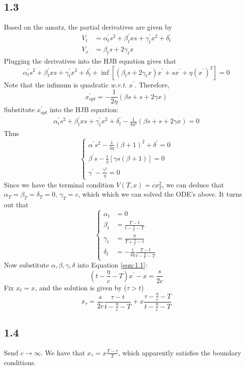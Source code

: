 \documentclass{article}
\begin{document}
\subsection*{1.3}
Based on the ansatz, the partial derivatives are given by
\begin{align*}
    V_t &= \alpha^\prime_t s^2 + \beta^\prime_t xs + \gamma^\prime_t x^2 + \delta^\prime_t \\
    V_x &= \beta_t s + 2\gamma_t x 
\end{align*}
Plugging the derivatives into the HJB equation gives that 
$$ \alpha^\prime_t s^2 + \beta^\prime_t xs + \gamma^\prime_t x^2 + \delta^\prime_t + 
\inf \left[(\beta_t s + 2\gamma_t x)x^\prime + sx^\prime + \eta (x^\prime)^2\right] = 0 $$
Note that the infimum is quadratic \textit{w.r.t.} $x^\prime$. Therefore,
\begin{equation} x^\prime_{opt} = -\frac{1}{2\eta}(\beta s + s + 2\gamma x) \label{eqn:1.1} \end{equation}
Substitute $x^\prime_{opt}$ into the HJB equation:
\begin{gather*}
    \alpha^\prime_t s^2 + \beta^\prime_t xs + \gamma^\prime_t x^2 + \delta^\prime_t -\frac{1}{4\eta^2}(\beta s + s 
    + 2\gamma x) = 0
\end{gather*}
Thus
\begin{equation*}
    \left\{ \begin{matrix}
    \alpha^\prime s^2 - \frac{1}{4\eta}(\beta + 1)^2 + \delta^\prime = 0 \\
    \beta^\prime s - \frac{1}{\eta} [\gamma s(\beta + 1)] = 0 \\
    \gamma^\prime - \frac{\gamma^2}{\eta} = 0
    \end{matrix} \right.
\end{equation*}
Since we have the terminal condition $V(T, x) = cx^2_T$, we can deduce that $\alpha_T = \beta_T = \delta_T = 0$, 
$\gamma_T = c$, which which we can solved the ODE's above. It turns out that 
\begin{equation*}
    \left\{ \begin{matrix}
        \alpha_t &= 0 \\
        \beta_t &= \frac{T - t}{t - \frac{\eta}{c} - T} \\
        \gamma_t &= \frac{\eta}{T + \frac{\eta}{c} - t} \\
        \delta_t &= -\frac{1}{4\eta}\frac{T - t}{t - \frac{\eta}{c} - T}
    \end{matrix} \right.
\end{equation*}
Now substitute $\alpha, \beta, \gamma, \delta$ into Equation \ref{eqn:1.1}:
$$ (t - \frac{\eta}{c} - T)x^\prime - x = \frac{s}{2c} $$
Fix $x_t = x$, and the solution is given by ($\tau > t$)
$$ x_\tau = \frac{s}{2c}\frac{\tau - t}{t - \frac{\eta}{c} - T} + x\frac{\tau - \frac{\eta}{c} - T}{t - \frac{\eta}
{c} - T} $$

\subsection*{1.4}
Send $c \to \infty$. We have that $x_\tau = x\frac{T - \tau}{T}$, which apparently satisfies the boundary conditions.
\end{document}
